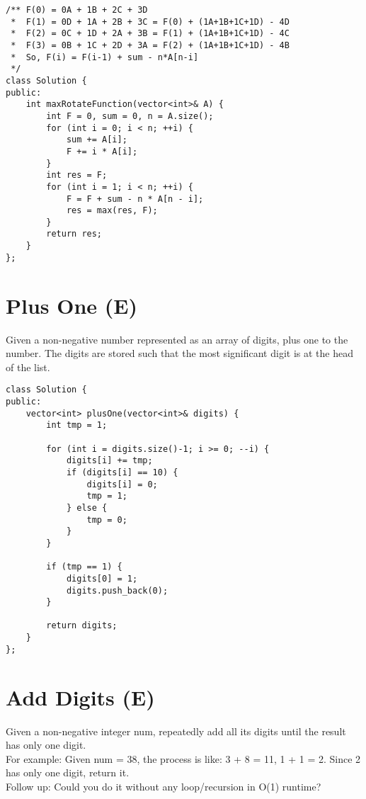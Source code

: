 \begin{lstlisting}
/** F(0) = 0A + 1B + 2C + 3D
 *  F(1) = 0D + 1A + 2B + 3C = F(0) + (1A+1B+1C+1D) - 4D
 *  F(2) = 0C + 1D + 2A + 3B = F(1) + (1A+1B+1C+1D) - 4C
 *  F(3) = 0B + 1C + 2D + 3A = F(2) + (1A+1B+1C+1D) - 4B
 *  So, F(i) = F(i-1) + sum - n*A[n-i]
 */
class Solution {
public:
    int maxRotateFunction(vector<int>& A) {
        int F = 0, sum = 0, n = A.size();
        for (int i = 0; i < n; ++i) {
            sum += A[i];
            F += i * A[i];
        }
        int res = F;
        for (int i = 1; i < n; ++i) {
            F = F + sum - n * A[n - i];
            res = max(res, F);
        }
        return res;
    }
};
\end{lstlisting}


\section{Plus One (E)}
Given a non-negative number represented as an array of digits, plus one to the number. The digits are stored such that the most significant digit is at the head of the list. \\

\begin{lstlisting}
class Solution {
public:
    vector<int> plusOne(vector<int>& digits) {
        int tmp = 1;
        
        for (int i = digits.size()-1; i >= 0; --i) {
            digits[i] += tmp;
            if (digits[i] == 10) {
                digits[i] = 0;
                tmp = 1;
            } else {
                tmp = 0;
            }
        }
        
        if (tmp == 1) {
            digits[0] = 1;
            digits.push_back(0);
        }
        
        return digits;
    }
};
\end{lstlisting}


\section{Add Digits (E)}
Given a non-negative integer num, repeatedly add all its digits until the result has only one digit.\\

For example:
Given num = 38, the process is like: 3 + 8 = 11, 1 + 1 = 2. Since 2 has only one digit, return it.\\

Follow up:
Could you do it without any loop/recursion in O(1) runtime? \\

